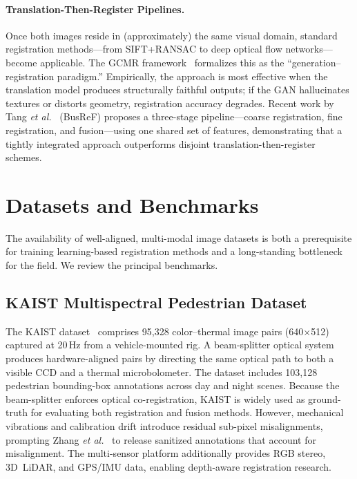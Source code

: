 \paragraph{Translation-Then-Register Pipelines.}
Once both images reside in (approximately) the same visual domain, standard
registration methods---from SIFT+RANSAC to deep optical flow networks---become
applicable. The GCMR framework~\cite{gcmr2023} formalizes this as the
``generation--registration paradigm.'' Empirically, the approach is most
effective when the translation model produces structurally faithful outputs; if
the GAN hallucinates textures or distorts geometry, registration accuracy
degrades. Recent work by Tang \textit{et al.}~\cite{busref2025} (BusReF)
proposes a three-stage pipeline---coarse registration, fine registration, and
fusion---using one shared set of features, demonstrating that a tightly
integrated approach outperforms disjoint translation-then-register schemes.


\section{Datasets and Benchmarks}
\label{sec:datasets}

The availability of well-aligned, multi-modal image datasets is both a
prerequisite for training learning-based registration methods and a
long-standing bottleneck for the field. We review the principal benchmarks.

\subsection{KAIST Multispectral Pedestrian Dataset}
\label{subsec:kaist}

The KAIST dataset~\cite{hwang2015multispectral} comprises 95,328 color--thermal
image pairs (640$\times$512) captured at 20\,Hz from a vehicle-mounted rig. A
beam-splitter optical system produces hardware-aligned pairs by directing the
same optical path to both a visible CCD and a thermal microbolometer. The
dataset includes 103,128 pedestrian bounding-box annotations across day and
night scenes. Because the beam-splitter enforces optical co-registration, KAIST
is widely used as ground-truth for evaluating both registration and fusion
methods. However, mechanical vibrations and calibration drift introduce
residual sub-pixel misalignments, prompting Zhang \textit{et al.}~\cite{
zhang2019weakly} to release sanitized annotations that account for
misalignment. The multi-sensor platform additionally provides RGB stereo,
3D~LiDAR, and GPS/IMU data, enabling depth-aware registration research.

